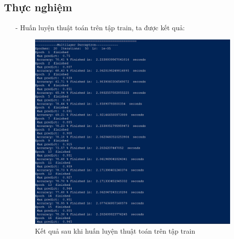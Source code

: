 \documentclass{report}
\newcommand\tab[1][1.25cm]{\hspace*{#1}}
\begin{document}
        \subsection{Thực nghiệm}
            \begin{enumerate}
                \item [- ] Huấn luyện thuật toán trên tập train, ta được kết quả:
                    \begin{center}
                        \begin{figure}[htp]
                            \begin{center}
                                \tab[1cm]\includegraphics[scale = 0.7]{image/MLP.png}
                                \caption{Kết quả sau khi huấn luyện thuật toán trên tập train}
                            \end{center}
                        \end{figure}
                    \end{center}
                    
                \pagebreak
                

\end{enumerate}
\end{document}

